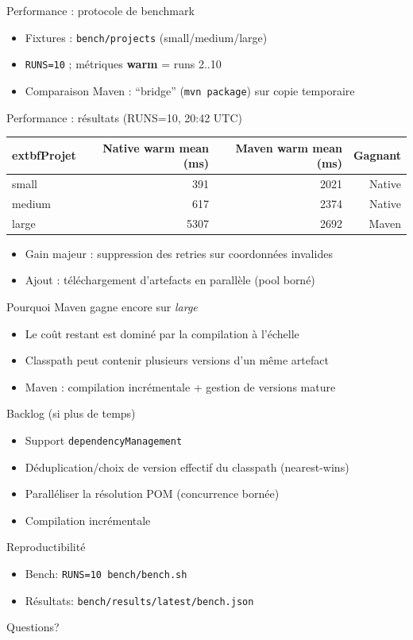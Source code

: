 \documentclass[aspectratio=169]{beamer}
\begin{document}
\begin{frame}{Performance : protocole de benchmark}
\begin{itemize}
  \item Fixtures : \texttt{bench/projects} (small/medium/large)
  \item \texttt{RUNS=10} ; métriques \textbf{warm} = runs 2..10
  \item Comparaison Maven : ``bridge'' (\texttt{mvn package}) sur copie temporaire
\end{itemize}
\end{frame}

\begin{frame}{Performance : résultats (RUNS=10, 20:42 UTC)}
\small
\begin{tabular}{lrrr}
\toprule
	extbf{Projet} & \textbf{Native warm mean (ms)} & \textbf{Maven warm mean (ms)} & \textbf{Gagnant}\\
\midrule
small  & 391  & 2021 & Native\\
medium & 617  & 2374 & Native\\
large  & 5307 & 2692 & Maven\\
\bottomrule
\end{tabular}

\vspace{0.5em}
\normalsize
\begin{itemize}
  \item Gain majeur : suppression des retries sur coordonnées invalides
  \item Ajout : téléchargement d’artefacts en parallèle (pool borné)
\end{itemize}
\end{frame}

\begin{frame}{Pourquoi Maven gagne encore sur \textit{large}}
\begin{itemize}
  \item Le coût restant est dominé par la compilation à l’échelle
  \item Classpath peut contenir plusieurs versions d’un même artefact
  \item Maven : compilation incrémentale + gestion de versions mature
\end{itemize}
\end{frame}

\begin{frame}{Backlog (si plus de temps)}
\begin{itemize}
  \item Support \texttt{dependencyManagement}
  \item Déduplication/choix de version effectif du classpath (nearest-wins)
  \item Paralléliser la résolution POM (concurrence bornée)
  \item Compilation incrémentale
\end{itemize}
\end{frame}

\begin{frame}{Reproductibilité}
\begin{itemize}
  \item Bench: \texttt{RUNS=10 bench/bench.sh}
  \item Résultats: \texttt{bench/results/latest/bench.json}
\end{itemize}
\end{frame}

\begin{frame}
  \centering
  \large Questions?
\end{frame}
\end{document}
